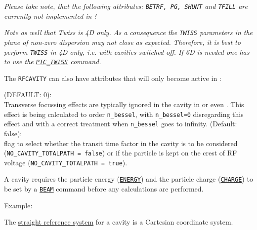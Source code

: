 \textit{Please take note, that the following \madeight attributes:
  \texttt{BETRF, PG, SHUNT} and \texttt{TFILL} are currently not implemented in 
  \madx!}    

\textit{Note as well that Twiss is 4D only. As a consequence
  the \texttt{TWISS} parameters in the plane of non-zero dispersion may not
  close as expected. Therefore, it is best to perform \texttt{TWISS} in 4D
  only, \textsl{i.e.} with cavities switched off. If 6D is needed one has to
  use the \hyperref[sec:ptc-twiss]{\texttt{PTC\_TWISS}} command.} 

The \texttt{RFCAVITY} can also have attributes that will only become active in 
\ptc: 
\begin{madlist}
    (DEFAULT: 0): \\
     Transverse focussing effects are typically ignored in the cavity in
     \madx or even \ptc. This effect is being calculated to order
     \texttt{n\_bessel}, with \texttt{n\_bessel=0} disregarding this
     effect and with a correct treatment when \texttt{n\_bessel} goes to
     infinity. 
    (Default: false): \\
     flag to select whether the transit time factor in the cavity is to be
     considered (\texttt{NO\_CAVITY\_TOTALPATH = false}) or if the particle is
     kept on the crest of RF voltage (\texttt{NO\_CAVITY\_TOTALPATH = true}).  
\end{madlist}

A cavity requires the particle energy (\hyperref[sec:beam]{\texttt{ENERGY}})
and the particle charge (\hyperref[sec:beam]{\texttt{CHARGE}}) to be set by a
\hyperref[sec:beam]{\texttt{BEAM}} command before any calculations are performed.  

Example: 

The \hyperref[subsec:local-straight]{straight reference system} for a
cavity is a Cartesian coordinate system.  


